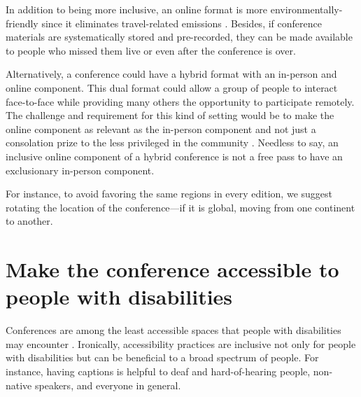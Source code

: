 \documentclass[10pt,letterpaper]{article}
\begin{document}
In addition to being more inclusive, an online format is more environmentally-friendly since it eliminates travel-related emissions \cite{sarabipourChangingScientificMeetings2021,ninerBetterWhomLeveling2021, gattrellComparisonCarbonCosts2021}. 
Besides, if conference materials are systematically stored and pre-recorded, they can be made available to people who missed them live or even after the conference is over. 

Alternatively, a conference could have a hybrid format with an in-person and online component. This dual format could allow a group of people to interact face-to-face while providing many others the opportunity to participate remotely. The challenge and requirement for this kind of setting would be to make the online component as relevant as the in-person component and not just a consolation prize to the less privileged in the community \cite{ninerBetterWhomLeveling2021}.
Needless to say, an inclusive online component of a hybrid conference is not a free pass to have an exclusionary in-person component. %

For instance, to avoid favoring the same regions in every edition, we suggest rotating the location of the conference—if it is global, moving from one continent to another. 


\section{Make the conference accessible to people with disabilities}
\label{rule_accessibility}

Conferences are among the least accessible spaces that people with disabilities may encounter \cite{priceAccessImaginedConstruction2009}.
Ironically, accessibility practices are inclusive not only for people with disabilities but can be beneficial to a broad spectrum of people. For instance, having captions is helpful to deaf and hard-of-hearing people, non-native speakers, and everyone in general. 
\end{document}
